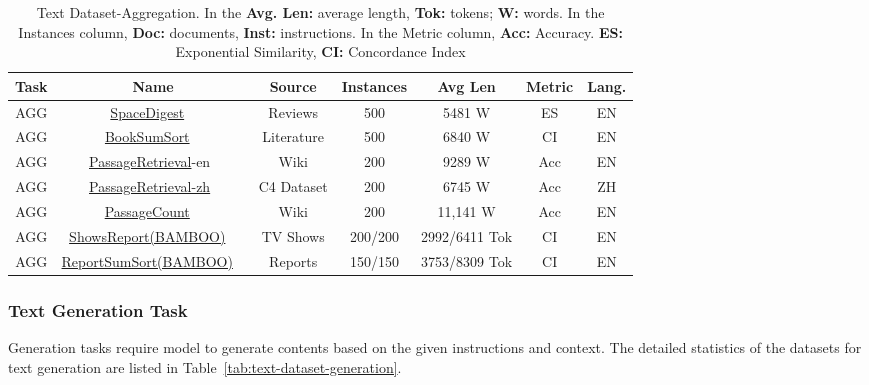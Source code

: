 \begin{table*}[t]
    \centering
    \caption{Text Dataset-Aggregation. In the \textbf{Avg. Len: }  average length, \textbf{Tok:}  tokens;  \textbf{W: } words. In the Instances column, \textbf{Doc:} documents, \textbf{Inst:} instructions. In the Metric column, \textbf{Acc:} Accuracy. \textbf{ES:} Exponential Similarity, \textbf{CI:} Concordance Index}
    \renewcommand{\arraystretch}{1.3} %
    \setlength{\tabcolsep}{1pt} %
    \label{tab:text-dataset-aggregation}
\begin{tabular}{c|c|c|c|c|c|c}
\hline
\textbf{Task} &
  \textbf{Name} &
  \textbf{Source} &
  \textbf{Instances} &
  \textbf{Avg Len} &
  \textbf{Metric} &
  \textbf{Lang.} \\ \hline

AGG &
  \href{https://github.com/tau-nlp/zero_scrolls}{SpaceDigest} ~\cite{shaham_zeroscrolls:_2023}&
  Reviews &
  500 &
  5481 W &
  ES & %
  EN \\ \hline
AGG &
  \href{https://github.com/tau-nlp/zero_scrolls}{BookSumSort} ~\cite{shaham_zeroscrolls:_2023}&
  Literature &
  500 &
  6840 W&
  CI & %
  EN \\ \hline
AGG &
  \href{https://huggingface.co/datasets/THUDM/LongBench}{PassageRetrieval}-en~\cite{bai_longbench:_2023} &
  Wiki &
  200 &
  9289 W &
  Acc &
  EN \\ \hline
AGG &
  \href{https://huggingface.co/datasets/THUDM/LongBench}{PassageRetrieval-zh}~\cite{bai_longbench:_2023} &
  C4 Dataset &
  200 &
  6745 W &
  Acc &
  ZH \\ \hline
AGG &
  \href{https://huggingface.co/datasets/THUDM/LongBench}{PassageCount} ~\cite{bai_longbench:_2023} &
  Wiki &
  200 &
  11,141 W &
  Acc &
  EN \\ \hline
AGG &
  \href{https://github.com/RUCAIBox/BAMBOO/tree/main/datasets}{ShowsReport(BAMBOO)} ~\cite{dong2023bamboo}&
  TV Shows &
  200/200 &
  2992/6411 Tok&
  CI & %
  EN \\ \hline
AGG&
  \href{https://github.com/RUCAIBox/BAMBOO/tree/main/datasets}{ReportSumSort(BAMBOO)} ~\cite{dong2023bamboo}&
  Reports &
  150/150 &
  3753/8309 Tok&
  CI &
  EN \\ \hline
\end{tabular}
\end{table*}


\subsubsection{Text Generation Task}
Generation tasks require model to generate contents based on the given instructions and context. 
The detailed statistics of the datasets for text generation are listed in Table~\ref{tab:text-dataset-generation}.

